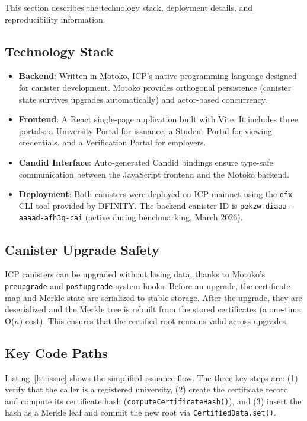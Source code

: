 \documentclass[journal]{IEEEtran}
\begin{document}
This section describes the technology stack, deployment details, and reproducibility information.

\subsection{Technology Stack}

\begin{itemize}[leftmargin=*]
  \item \textbf{Backend}: Written in Motoko, ICP's native programming language designed for canister development. Motoko provides orthogonal persistence (canister state survives upgrades automatically) and actor-based concurrency.
  \item \textbf{Frontend}: A React single-page application built with Vite. It includes three portals: a University Portal for issuance, a Student Portal for viewing credentials, and a Verification Portal for employers.
  \item \textbf{Candid Interface}: Auto-generated Candid bindings ensure type-safe communication between the JavaScript frontend and the Motoko backend.
  \item \textbf{Deployment}: Both canisters were deployed on ICP mainnet using the \texttt{dfx} CLI tool provided by DFINITY. The backend canister ID is \texttt{pekzw-diaaa-aaaad-afh3q-cai} (active during benchmarking, March 2026).
\end{itemize}

\subsection{Canister Upgrade Safety}

ICP canisters can be upgraded without losing data, thanks to Motoko's \texttt{preupgrade} and \texttt{postupgrade} system hooks. Before an upgrade, the certificate map and Merkle state are serialized to stable storage. After the upgrade, they are deserialized and the Merkle tree is rebuilt from the stored certificates (a one-time O($n$) cost). This ensures that the certified root remains valid across upgrades.

\subsection{Key Code Paths}

Listing~\ref{lst:issue} shows the simplified issuance flow. The three key steps are: (1) verify that the caller is a registered university, (2) create the certificate record and compute its certificate hash (\texttt{computeCertificateHash()}), and (3) insert the hash as a Merkle leaf and commit the new root via \texttt{CertifiedData.set()}.
\end{document}
